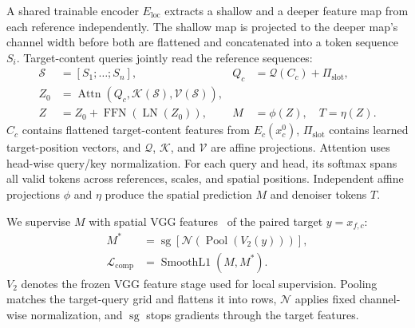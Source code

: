\documentclass{article}
\begin{document}
A shared trainable encoder $E_{\mathrm{loc}}$ extracts a shallow and a deeper feature map from each reference independently.
The shallow map is projected to the deeper map's channel width before both are flattened and concatenated into a token sequence $S_i$.
Target-content queries jointly read the reference sequences:
\begin{equation}
\begin{aligned}
\mathcal S
&=
[S_1;\ldots;S_n],
&
Q_c
&=
\mathcal Q(C_c)+\Pi_{\mathrm{slot}},\\
Z_0
&=
\operatorname{Attn}\!\left(
    Q_c,
    \mathcal K(\mathcal S),
    \mathcal V(\mathcal S)
\right),\\
Z
&=
Z_0+\operatorname{FFN}(\operatorname{LN}(Z_0)),
&
M
&=
\phi(Z),\quad T=\eta(Z).
\end{aligned}
\label{eq:tc}
\end{equation}
$C_c$ contains flattened target-content features from $E_c(x_c^0)$, $\Pi_{\mathrm{slot}}$ contains learned target-position vectors, and $\mathcal Q$, $\mathcal K$, and $\mathcal V$ are affine projections.
Attention uses head-wise query/key normalization.
For each query and head, its softmax spans all valid tokens across references, scales, and spatial positions.
Independent affine projections $\phi$ and $\eta$ produce the spatial prediction $M$ and denoiser tokens $T$.

We supervise $M$ with spatial VGG features~\citep{Simonyan15} of the paired target $y=x_{f,c}$:
\begin{equation}
\begin{aligned}
M^*
&=
\operatorname{sg}\!\left[
    \mathcal N\!\left(
        \operatorname{Pool}(V_2(y))
    \right)
\right],\\
\mathcal L_{\mathrm{comp}}
&=
\operatorname{SmoothL1}(M,M^*).
\end{aligned}
\label{eq:completion}
\end{equation}
$V_2$ denotes the frozen VGG feature stage used for local supervision.
Pooling matches the target-query grid and flattens it into rows, $\mathcal N$ applies fixed channel-wise normalization, and $\operatorname{sg}$ stops gradients through the target features.
\end{document}
